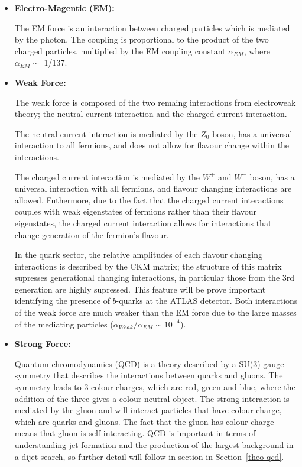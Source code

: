 \begin{itemize}[leftmargin=*]
\item\textbf{Electro-Magentic (EM):}

  The EM force is an interaction between charged particles which is mediated by the photon.
  The coupling is proportional to the product of the two charged particles.
  multiplied by the EM coupling constant $\alpha_{EM}$, where $\alpha_{EM} \sim$ 1/137.\vspace{0.5em}

\item\textbf{Weak Force:}

  The weak force is composed of the two remaing interactions from electroweak theory;
  the neutral current interaction and the charged current interaction.
  
  The neutral current interaction is mediated by the $Z_0$ boson, has a universal interaction to all fermions,
  and does not allow for flavour change within the interactions.

  The charged current interaction is mediated by the $W^+$ and $W^-$ boson, has a universal interaction with all fermions,
  and flavour changing interactions are allowed.
  Futhermore, due to the fact that the charged current interactions couples with weak eigenstates of fermions rather than
  their flavour eigenstates, the charged current interaction allows for interactions that change generation of the fermion's flavour.
  
  In the quark sector, the relative amplitudes of each flavour changing interactions is described by the CKM matrix;
  the structure of this matrix supresses generational changing interactions,
  in particular those from the 3rd generation  are highly supressed.
  This feature will be prove important identifying the presence of $b$-quarks at the ATLAS detector.
  Both interactions of the weak force are much weaker than the EM force due to the large masses of the mediating particles
  ($\alpha_{Weak}/\alpha_{EM} \sim 10^{-4}$).\vspace{0.5em}
  
\item\textbf{Strong Force:}

  Quantum chromodynamics (QCD) is a theory described by a SU(3) gauge symmetry that describes the interactions between quarks and gluons.
  The symmetry leads to 3 colour charges, which are red, green and blue,
  where the addition of the three gives a colour neutral object.
  The strong interaction is mediated by the gluon and will interact particles that have colour charge, which are quarks and gluons.
  The fact that the gluon has colour charge means that gluon is self interacting.
  QCD is important in terms of understanding jet formation and the production of the
  largest background in a dijet search, so further detail will follow in section in Section~\ref{theo-qcd}.


\end{itemize}
